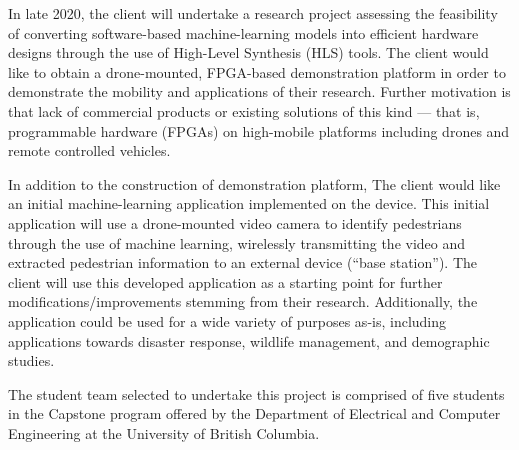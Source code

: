 In late 2020, the client will undertake a research project assessing the feasibility of converting software-based machine-learning models into efficient hardware designs through the use of High-Level Synthesis (HLS) tools. The client would like to obtain a drone-mounted, FPGA-based demonstration platform in order to demonstrate the mobility and applications of their research. Further motivation is that lack of commercial products or existing solutions of this kind --- that is, programmable hardware (FPGAs) on high-mobile platforms including drones and remote controlled vehicles.

In addition to the construction of demonstration platform, The client would like an initial machine-learning application implemented on the device. This initial application will use a drone-mounted video camera to identify pedestrians through the use of machine learning, wirelessly transmitting the video and extracted pedestrian information to an external device (``base station''). The client will use this developed application as a starting point for further modifications/improvements stemming from their research. Additionally, the application could be used for a wide variety of purposes as-is, including applications towards disaster response, wildlife management, and demographic studies.

The student team selected to undertake this project is comprised of five students in the Capstone program offered by the Department of Electrical and Computer Engineering at the University of British Columbia.
